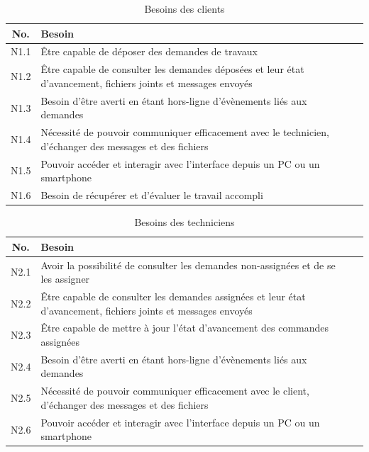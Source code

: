 \documentclass[
    iai, %
    eai, %
]{heig-tb}
\begin{document}
\begin{table}[h]
  \begin{center}
    \caption{Besoins des clients}
    \begin{tabularx}{\textwidth}{cXc}
      No.  & Besoin                                                                                                         \\ \toprule
      N1.1 & Être capable de déposer des demandes de travaux                                                                \\ \midrule
      N1.2 & Être capable de consulter les demandes déposées et leur état d'avancement, fichiers joints et messages envoyés \\ \midrule
      N1.3 & Besoin d'être averti en étant hors-ligne d'évènements liés aux demandes                                        \\ \midrule
      N1.4 & Nécessité de pouvoir communiquer efficacement avec le technicien, d'échanger des messages et des fichiers      \\ \midrule
      N1.5 & Pouvoir accéder et interagir avec l'interface depuis un PC ou un smartphone                                    \\ \midrule
      N1.6 & Besoin de récupérer et d'évaluer le travail accompli                                                           \\ \midrule
    \end{tabularx}
  \end{center}
\end{table}

\begin{table}[h]
  \begin{center}
    \caption{Besoins des techniciens}
    \begin{tabularx}{\textwidth}{cXc}
      No.  & Besoin                                                                                                          \\ \toprule
      N2.1 & Avoir la possibilité de consulter les demandes non-assignées et de se les assigner                              \\ \midrule
      N2.2 & Être capable de consulter les demandes assignées et leur état d'avancement, fichiers joints et messages envoyés \\ \midrule
      N2.3 & Être capable de mettre à jour l'état d'avancement des commandes assignées                                       \\ \midrule
      N2.4 & Besoin d'être averti en étant hors-ligne d'évènements liés aux demandes                                         \\ \midrule
      N2.5 & Nécessité de pouvoir communiquer efficacement avec le client, d'échanger des messages et des fichiers           \\ \midrule
      N2.6 & Pouvoir accéder et interagir avec l'interface depuis un PC ou un smartphone                                     \\ \midrule
    \end{tabularx}
  \end{center}
\end{table}
\end{document}

